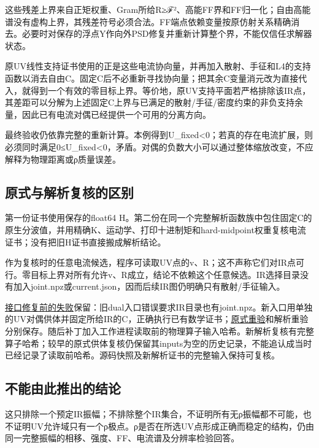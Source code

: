 \documentclass[
  10pt,
  a4paper,
]{article}
\begin{document}
这些残差上界来自正矩权重、Gram所给R≥\textbar ℱ\textbar²、高能FF界和FF归一化；自由高能谱没有虚构上界，其残差符号必须合法。FF端点依赖变量按原仿射关系精确消去。必要时对保存的浮点Y作向外PSD修复并重新计算整个界，不能仅信任求解器状态。

原UV线性支持证书使用的正是这些电流协向量，并再加入散射、手征和L4的支持函数以消去自由C。固定C后不必重新寻找协向量；把其余C变量消元改为直接代入，就得到一个有效的零目标上界。等价地，原UV支持平面若严格排除该IR点，其差距可以分解为上述固定C上界与已满足的散射/手征/密度约束的非负支持余量，因此已有电流对偶已经提供一个可用的分离方向。

最终验收仍依靠完整的重新计算。本例得到U\_fixed\textless0；若真的存在电流扩展，则必须同时满足0≤U\_fixed\textless0，矛盾。对偶的负数大小可以通过整体缩放改变，不应解释为物理距离或ρ质量误差。

\subsection{原式与解析复核的区别}\label{ux539fux5f0fux4e0eux89e3ux6790ux590dux6838ux7684ux533aux522b}

第一份证书使用保存的float64
H。第二份在同一个完整解析函数族中包住固定C的原生分波值，并用精确K、运动学、打印十进制矩和hard-midpoint权重复核电流证书；没有把旧H证书直接搬成解析结论。

作为复核时的任意电流候选，程序可读取UV点的v、R；这不声称它们对IR点可行。零目标上界对所有允许v、R成立，结论不依赖这个任意候选。IR选择目录没有加入joint.npz或current.json，因而后续IR图仍明确只有散射/手征输入。

\href{../../../fixed_IR_dual_before_fix/report.json}{接口修复前的失败}保留：旧dual入口错误要求IR目录也有joint.npz。新入口用单独的UV对偶供体并固定所给IR的C，正确执行已有数学证书；\href{../../../interlaced_fixed_IR_dual/report.json}{原式重验}和解析重验分别保存。随后补丁加入工作进程读取前的物理算子输入哈希。新解析复核有完整算子哈希；较早的原式供体复核仍保留其inputs为空的历史记录，不能追认成当时已经记录了读取前哈希。源码快照及新解析证书的完整输入保持可复核。

\subsection{不能由此推出的结论}\label{ux4e0dux80fdux7531ux6b64ux63a8ux51faux7684ux7ed3ux8bba}

这只排除一个预定IR振幅；不排除整个IR集合，不证明所有无ρ振幅都不可能，也不证明UV允许域只有一个ρ极点。ρ是否在所选UV点形成正确而稳定的结构，仍由同一完整振幅的相移、强度、FF、电流谱及分辨率检验回答。
\end{document}

